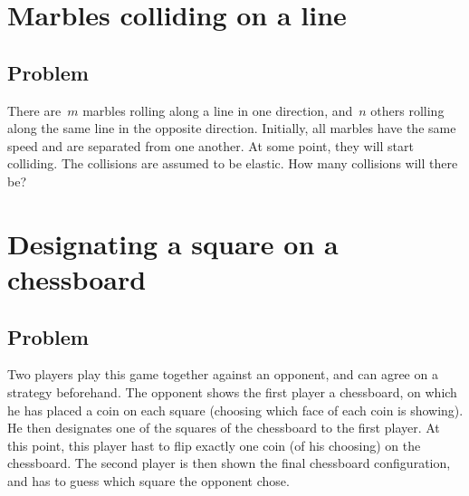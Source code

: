 \documentclass{article}
\begin{document}
\section{Marbles colliding on a line}

\subsection{Problem}

There are~$m$ marbles rolling along a line in one direction, and~$n$ others rolling along the same line in the opposite direction. Initially, all marbles have the same speed and are separated from one another. At some point, they will start colliding. The collisions are assumed to be elastic. How many collisions will there be?


\section{Designating a square on a chessboard}

\subsection{Problem}

Two players play this game together against an opponent, and can agree on a strategy beforehand. The opponent shows the first player a chessboard, on which he has placed a coin on each square (choosing which face of each coin is showing). He then designates one of the squares of the chessboard to the first player. At this point, this player hast to flip exactly one coin (of his choosing) on the chessboard. The second player is then shown the final chessboard configuration, and has to guess which square the opponent chose.
\end{document}
